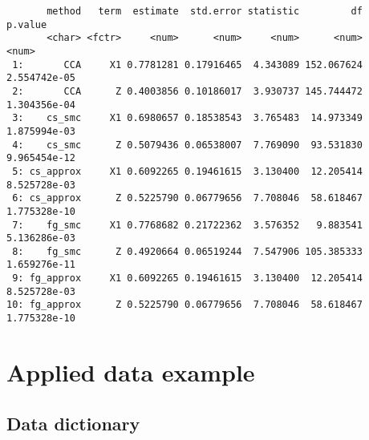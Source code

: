 \documentclass[
  12pt,
  a4paper,
]{article}
\begin{document}
\begin{verbatim}
       method   term  estimate  std.error statistic         df      p.value
       <char> <fctr>     <num>      <num>     <num>      <num>        <num>
 1:       CCA     X1 0.7781281 0.17916465  4.343089 152.067624 2.554742e-05
 2:       CCA      Z 0.4003856 0.10186017  3.930737 145.744472 1.304356e-04
 3:    cs_smc     X1 0.6980657 0.18538543  3.765483  14.973349 1.875994e-03
 4:    cs_smc      Z 0.5079436 0.06538007  7.769090  93.531830 9.965454e-12
 5: cs_approx     X1 0.6092265 0.19461615  3.130400  12.205414 8.525728e-03
 6: cs_approx      Z 0.5225790 0.06779656  7.708046  58.618467 1.775328e-10
 7:    fg_smc     X1 0.7768682 0.21722362  3.576352   9.883541 5.136286e-03
 8:    fg_smc      Z 0.4920664 0.06519244  7.547906 105.385333 1.659276e-11
 9: fg_approx     X1 0.6092265 0.19461615  3.130400  12.205414 8.525728e-03
10: fg_approx      Z 0.5225790 0.06779656  7.708046  58.618467 1.775328e-10
\end{verbatim}

\newpage

\section{Applied data example}\label{applied-data-example}

\subsection{Data dictionary}\label{data-dictionary}
\end{document}
